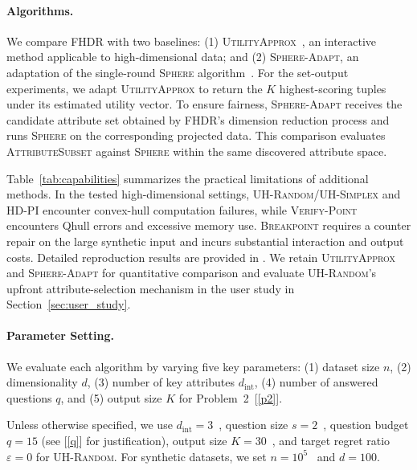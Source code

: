 \documentclass[conference]{IEEEtran}
\theoremstyle{definition}
\theoremstyle{plain}
\newcommand{\technicalreport}{\iftoggle{LinkTechnicalReport}{\href{https://github.com/JunyuLiao/High-dimensional-Regret-Minimization/blob/main/docs/TechnicalReport.pdf}{technical report}}{technical report}}
\begin{document}
\paragraph{\textbf{Algorithms. }}
We compare \textsc{FHDR} with two baselines: (1) \textsc{UtilityApprox}~\cite{NL12}, an interactive method applicable to high-dimensional data; and (2) \textsc{Sphere-Adapt}, an adaptation of the single-round \textsc{Sphere} algorithm~\cite{XW18}. For the set-output experiments, we adapt \textsc{UtilityApprox} to return the $K$ highest-scoring tuples under its estimated utility vector. To ensure fairness, \textsc{Sphere-Adapt} receives the candidate attribute set obtained by FHDR’s dimension reduction process and runs \textsc{Sphere} on the corresponding projected data. This comparison evaluates \textsc{AttributeSubset} against \textsc{Sphere} within the same discovered attribute space.

Table~\ref{tab:capabilities} summarizes the practical limitations of additional methods. In the tested high-dimensional settings, \textsc{UH-Random}/\textsc{UH-Simplex} and \textsc{HD-PI} encounter convex-hull computation failures, while \textsc{Verify-Point} encounters Qhull errors and excessive memory use. \textsc{Breakpoint} requires a counter repair on the large synthetic input and incurs substantial interaction and output costs. Detailed reproduction results are provided in \iftoggle{TechnicalReport}{Section~\ref{appen:capabilities} of the \technicalreport}{Appendix~\ref{appen:capabilities}}. We retain \textsc{UtilityApprox} and \textsc{Sphere-Adapt} for quantitative comparison and evaluate \textsc{UH-Random}’s upfront attribute-selection mechanism in the user study in Section~\ref{sec:user_study}.

\paragraph{\textbf{Parameter Setting. }}
We evaluate each algorithm by varying five key parameters: (1) dataset size $n$, (2) dimensionality $d$, (3) number of key attributes $d_\text{int}$, (4) number of answered questions $q$, and (5) output size $K$ for Problem~2~[\ref{p2}].

Unless otherwise specified, we use $d_\text{int}=3$~\cite{GG96, GA12, WX22, SC05, TK03, DMW12}, question size $s=2$~\cite{NL12}, question budget $q=15$ (see [\ref{q}] for justification), output size $K=30$~\cite{XW18}, and target regret ratio $\varepsilon=0$ for \textsc{UH-Random}. For synthetic datasets, we set $n=10^5$~\cite{NL12, WWX21, XCL19, XW18} and $d=100$.
\end{document}
